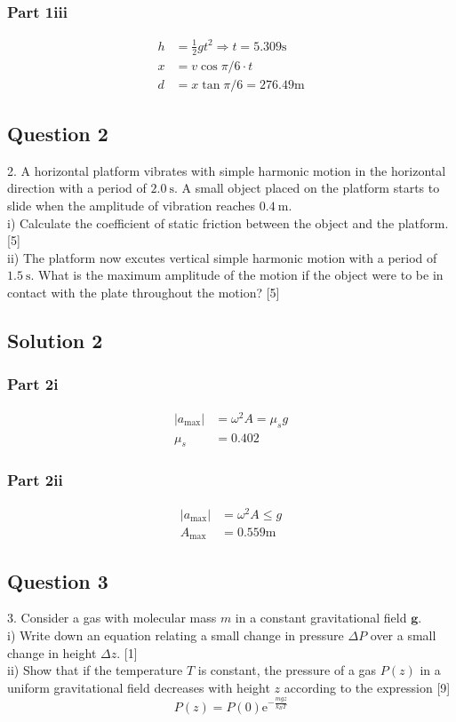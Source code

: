 \documentclass{article}
\begin{document}
\subsubsection{Part 1iii}
\begin{align}
    h &= \frac{1}{2} gt^2 \Rightarrow t = 5.309 \mathrm{s} \\
    x &= v \cos\pi/6 \cdot t \\
    d &= x\tan \pi/6 = 276.49 \mathrm{m}
\end{align}
\subsection{Question 2}
2. A horizontal platform vibrates with simple harmonic motion in the horizontal direction with a period of $2.0 \mathrm{~s}$. A small object placed on the platform starts to slide when the amplitude of vibration reaches $0.4 \mathrm{~m}$. \\
i) Calculate the coefficient of static friction between the object and the platform. [5] \\
ii) The platform now excutes vertical simple harmonic motion with a period of $1.5 \mathrm{~s}$. What is the maximum amplitude of the motion if the object were to be in contact with the plate throughout the motion? [5]

\subsection{Solution 2}
\subsubsection{Part 2i}
\begin{align}
    |a_{\max}| &= \omega^2 A = \mu_s g \\
    \mu_s &= 0.402
\end{align}

\subsubsection{Part 2ii}
\begin{align}
    |a_{\max}| &= \omega^2 A \leq g \\
    A_{\max} &= 0.559 \mathrm{m}
\end{align}


\subsection{Question 3}
3. Consider a gas with molecular mass $m$ in a constant gravitational field $\mathbf{g}$. \\
i) Write down an equation relating a small change in pressure $\Delta P$ over a small change in height $\Delta z$. [1] \\
ii) Show that if the temperature $T$ is constant, the pressure of a gas $P(z)$ in a uniform gravitational field decreases with height $z$ according to the expression [9]
$$
P(z)=P(0) \mathrm{e}^{-\frac{m g z}{k_{B} T}}
$$
\end{document}
